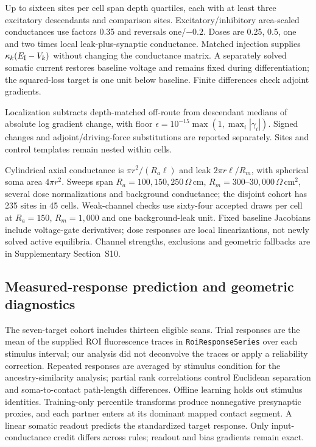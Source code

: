 \documentclass[11pt]{article}
\begin{document}
Up to sixteen sites per cell span depth quartiles, each with at least three excitatory descendants and comparison sites. Excitatory/inhibitory area-scaled conductances use factors 0.35 and reversals one/$-0.2$. Doses are 0.25, 0.5, one and two times local leak-plus-synaptic conductance. Matched injection supplies $\kappa_k(E_{\rm I}-V_k)$ without changing the conductance matrix. A separately solved somatic current restores baseline voltage and remains fixed during differentiation; the squared-loss target is one unit below baseline. Finite differences check adjoint gradients.

Localization subtracts depth-matched off-route from descendant medians of absolute log gradient change, with floor $\epsilon=10^{-15}\max(1,\max_i|\gamma_i|)$. Signed changes and adjoint/driving-force substitutions are reported separately. Sites and control templates remain nested within cells.

Cylindrical axial conductance is $\pi r^2/(R_a\ell)$ and leak $2\pi r\ell/R_m$, with spherical soma area $4\pi r^2$. Sweeps span $R_a=100,150,250\,\Omega\,\mathrm{cm}$, $R_m=300$--$30,000\,\Omega\,\mathrm{cm}^2$, several dose normalizations and background conductance; the disjoint cohort has 235 sites in 45 cells. Weak-channel checks use sixty-four accepted draws per cell at $R_a=150$, $R_m=1,000$ and one background-leak unit. Fixed baseline Jacobians include voltage-gate derivatives; dose responses are local linearizations, not newly solved active equilibria. Channel strengths, exclusions and geometric fallbacks are in Supplementary Section~S10.



\subsection*{Measured-response prediction and geometric diagnostics}

The seven-target cohort includes thirteen eligible scans. Trial responses are the mean of the supplied ROI fluorescence traces in \texttt{RoiResponseSeries} over each stimulus interval; our analysis did not deconvolve the traces or apply a reliability correction. Repeated responses are averaged by stimulus condition for the ancestry-similarity analysis; partial rank correlations control Euclidean separation and soma-to-contact path-length differences. Offline learning holds out stimulus identities. Training-only percentile transforms produce nonnegative presynaptic proxies, and each partner enters at its dominant mapped contact segment. A linear somatic readout predicts the standardized target response. Only input-conductance credit differs across rules; readout and bias gradients remain exact.
\end{document}

